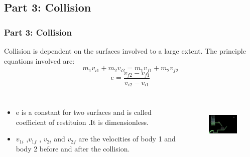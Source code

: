 \subsection{Part 3: Collision}
\begin{frame}
	\frametitle{Part 3: Collision}
	\center
	Collision is dependent on the surfaces involved to a large extent. The principle equations involved are:\cite{Collision} \pause \\
	
	\begin{equation}
		m_1 v_{i1} + m_2 v_{i2} = m_1 v_{f1} + m_2 v_{f2}
	\end{equation}
	\pause
	\begin{equation}
		e = \frac{v_{f2} - v_{f1}}{v_{i2}-v_{i1}}
	\end{equation}	
	\pause
	\begin{columns}
		\begin{itemize}
			\item e is a constant for two surfaces and is called  coefficient of restituion .It is dimensionless.\\\pause
			\item $ v_{1i} $ ,$ v_{1f} $ , $ v_{2i} $ and $ v_{2f} $ are the velocities of body 1 and body 2 before and after the collision.\\\pause
		\end{itemize}
		\begin{figure}
			\includegraphics[width=2.5cm,height=2.5cm]{collision.jpg}
		\end{figure}
	\end{columns}
\end{frame}
